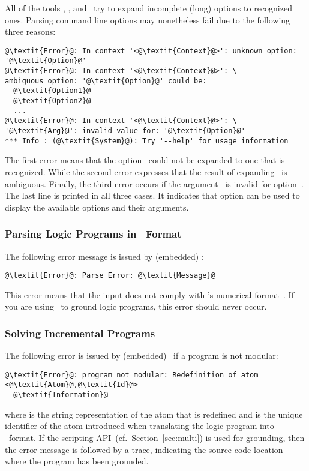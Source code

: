 All of the tools \gringo, \clasp, and \clingo\
try to expand incomplete (long) options to recognized ones.
Parsing command line options may nonetheless fail due to the following three reasons:
%
\begin{lstlisting}[numbers=none,escapechar=@]
@\textit{Error}@: In context '<@\textit{Context}@>': unknown option: '@\textit{Option}@'
@\textit{Error}@: In context '<@\textit{Context}@>': \
ambiguous option: '@\textit{Option}@' could be:
  @\textit{Option1}@
  @\textit{Option2}@
  ...
@\textit{Error}@: In context '<@\textit{Context}@>': \
'@\textit{Arg}@': invalid value for: '@\textit{Option}@'
*** Info : (@\textit{System}@): Try '--help' for usage information
\end{lstlisting}
%
The first error means that the option~
could not be expanded to one that is recognized.
While the second error expresses that the result of expanding~\codeit{Option} is ambiguous.
Finally, the third error occurs if the argument~ is invalid for option~.
The last line is printed in all three cases.
It indicates that option \code{--help} can be used to display the available options and their arguments.

\subsubsection{Parsing Logic Programs in \smodels\ Format}\label{subsec:error:lparse}

The following error message is issued by (embedded) \clasp:
%
\begin{lstlisting}[numbers=none,escapechar=@]
@\textit{Error}@: Parse Error: @\textit{Message}@
\end{lstlisting}
%
This error means that the input does not comply with \smodels's numerical format~\cite{lparseManual}.
If you are using \gringo\ to ground logic programs,
this error should never occur.

\subsubsection{Solving Incremental Programs}
The following error is issued by (embedded) \clasp\ if a program is not modular:
\begin{lstlisting}[numbers=none,escapechar=@]
@\textit{Error}@: program not modular: Redefinition of atom <@\textit{Atom}@,@\textit{Id}@>
  @\textit{Information}@
\end{lstlisting}
where \codeit{Atom} is the string representation of the atom that is redefined
and \codeit{Id} is the unique identifier of the atom introduced when translating the logic program into \smodels\ format.
If the scripting API~(cf.~Section~\ref{sec:multi}) is used for grounding,
then the error message is followed by a trace,
indicating the source code location where the program has been grounded.

